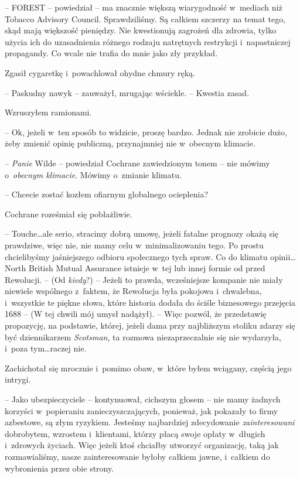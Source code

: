 \documentclass[oneside,polish,11pt,sfheadings]{mwbk}
\begin{document}
-- FOREST -- powiedział -- ma znacznie większą wiarygodność w~mediach niż
Tobacco Advisory Council. Sprawdziliśmy. Są całkiem szczerzy na temat
tego, skąd mają większość pieniędzy. Nie kwestionują zagrożeń dla
zdrowia, tylko użycia ich do uzasadnienia różnego rodzaju natrętnych
restrykcji i~napastniczej propagandy. Co wcale nie trafia do mnie jako
zły przykład.

Zgasił cygaretkę i~powachlował ohydne chmury ręką. 

-- Paskudny nawyk -- zauważył, mrugając wściekle. -- Kwestia zasad.

Wzruszyłem ramionami. 

-- Ok, jeżeli w~ten sposób to widzicie, proszę
bardzo. Jednak nie zrobicie dużo, żeby zmienić opinię publiczną,
przynajmniej nie w~obecnym klimacie.

-- \emph{Panie} Wilde -- powiedział Cochrane zawiedzionym tonem -- nie
mówimy o~\emph{obecnym klimacie}. Mówimy o~zmianie klimatu.

-- Chcecie zostać kozłem ofiarnym globalnego ocieplenia?

Cochrane roześmiał się pobłażliwie. 

-- Touche\ldots ale serio, stracimy
dobrą umowę, jeżeli fatalne prognozy okażą się prawdziwe, więc nie, nie
mamy celu w~minimalizowaniu tego. Po prostu chcielibyśmy jaśniejszego
odbioru społecznego tych spraw. Co do klimatu opinii\ldots North British
Mutual Assurance istnieje w~tej lub innej formie od przed Rewolucji. -- (Od \emph{kiedy}?) -- Jeżeli to prawda, wcześniejsze kompanie nie miały
niewiele wspólnego z~faktem, że Rewolucja była pokojowa i~chwalebna, i~wszystkie te piękne słowa, które historia dodała do ściśle biznesowego
przejęcia 1688 -- (W tej chwili mój umysł nadążył). -- Więc pozwól, że
przedstawię propozycję, na podstawie, której, jeżeli dama przy
najbliższym stoliku zdarzy się być dziennikarzem \emph{Scotsman}, ta
rozmowa niezaprzeczalnie się nie wydarzyła, i~poza tym\ldots raczej nie.

Zachichotał się mrocznie i~pomimo obaw, w~które byłem wciągany, częścią
jego intrygi.

-- Jako ubezpieczyciele -- kontynuował, cichszym głosem -- nie mamy
żadnych korzyści w~popieraniu zanieczyszczających, ponieważ, jak pokazały
to firmy azbestowe, są złym ryzykiem. Jesteśmy najbardziej zdecydowanie
\emph{zainteresowani} dobrobytem, wzrostem i~klientami, którzy płacą
swoje opłaty w~długich i~zdrowych życiach. Więc jeżeli ktoś chciałby
utworzyć organizację, taką jak rozmawialiśmy, nasze zainteresowanie
byłoby całkiem jawne, i~całkiem do wybronienia przez obie strony.
\end{document}
